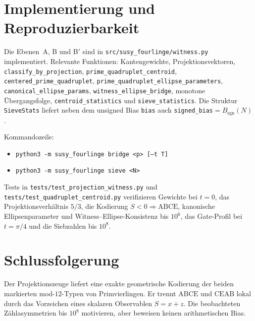 \documentclass[11pt,a4paper]{article}
\theoremstyle{definition}
\theoremstyle{plain}
\begin{document}
	\section{Implementierung und Reproduzierbarkeit}
	
	Die Ebenen~A, B und B$'$ sind in \texttt{src/susy\_fourlinge/witness.py} implementiert. Relevante Funktionen: Kantengewichte, Projektionsvektoren, \texttt{classify\_by\_projection}, \texttt{prime\_quadruplet\_centroid}, \texttt{centered\_prime\_quadruplet}, \texttt{prime\_quadruplet\_ellipse\_parameters}, \texttt{canonical\_ellipse\_params}, \texttt{witness\_ellipse\_bridge}, monotone Übergangsfolge, \texttt{centroid\_statistics} und \texttt{sieve\_statistics}. Die Struktur \texttt{SieveStats} liefert neben dem unsigned Bias \texttt{bias} auch \texttt{signed\_bias}$=B_{\mathrm{sgn}}(N)$.
	
	Kommandozeile:
	\begin{itemize}
		\item \texttt{python3 -m susy\_fourlinge bridge <p> [--t T]}
		\item \texttt{python3 -m susy\_fourlinge sieve <N>}
	\end{itemize}
	
	Tests in \texttt{tests/test\_projection\_witness.py} und \texttt{tests/test\_quadruplet\_centroid.py} verifizieren Gewichte bei $t=0$, das Projektionsverhältnis $5/3$, die Kodierung $S<0\Rightarrow\mathrm{ABCE}$, kanonische Ellipsenparameter und Witness--Ellipse-Konsistenz bis $10^6$, das Gate-Profil bei $t=\pi/4$ und die Siebzahlen bis $10^8$.
	
	\section{Schlussfolgerung}
	
	Der Projektionszeuge liefert eine exakte geometrische Kodierung der beiden markierten mod-$12$-Typen von Primvierlingen. Er trennt $\mathrm{ABCE}$ und $\mathrm{CEAB}$ lokal durch das Vorzeichen eines skalaren Observablen $S=x+z$. Die beobachteten Zählasymmetrien bis $10^8$ motivieren, aber beweisen keinen arithmetischen Bias.
	
\end{document}
